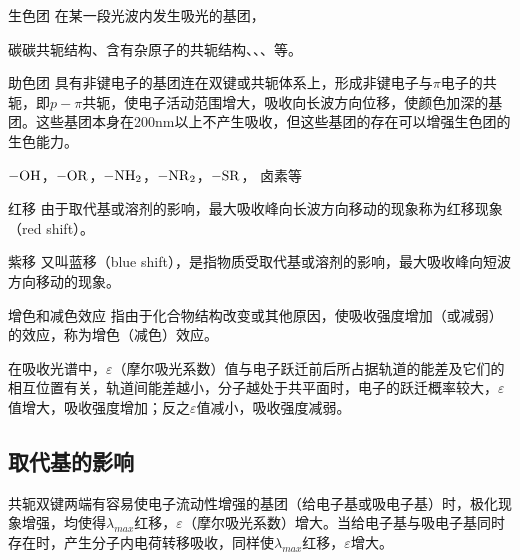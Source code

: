 \begin{definition*}{生色团}
    在某一段光波内发生吸光的基团，
    \begin{example}
        碳碳共轭结构、含有杂原子的共轭结构、、、等。
    \end{example}
\end{definition*}
\begin{definition*}{助色团}
    具有非键电子的基团连在双键或共轭体系上，形成非键电子与$\pi$电子的共轭，即$p-\pi$共轭，使电子活动范围增大，吸收向长波方向位移，使颜色加深的基团。这些基团本身在200$\mathrm{nm}$以上不产生吸收，但这些基团的存在可以增强生色团的生色能力。
    \begin{example}
        $\ce{-OH}$，$\ce{-OR}$，$ \ce{-NH_{2}}$，$ \ce{-NR_{2}}$，$ \ce{-SR}$， 卤素等
    \end{example}
\end{definition*}
\begin{definition*}{红移}
    由于取代基或溶剂的影响，最大吸收峰向长波方向移动的现象称为红移现象 （red shift）。
\end{definition*}
\begin{definition*}{紫移}
    又叫蓝移（blue shift），是指物质受取代基或溶剂的影响，最大吸收峰向短波方向移动的现象。
\end{definition*}
\begin{definition*}{增色和减色效应}
    指由于化合物结构改变或其他原因，使吸收强度增加（或减弱）的效应，称为增色（减色）效应。
\end{definition*}
\begin{note}
    在吸收光谱中，$\varepsilon $（摩尔吸光系数）值与电子跃迁前后所占据轨道的能差及它们的相互位置有关，轨道间能差越小，分子越处于共平面时，电子的跃迁概率较大，$\varepsilon $值增大，吸收强度增加；反之$\varepsilon$值减小，吸收强度减弱。
\end{note}
\subsection{取代基的影响} 
共轭双键两端有容易使电子流动性增强的基团（给电子基或吸电子基）时，极化现象增强，均使得$\lambda_{max}$红移，$\varepsilon$（摩尔吸光系数）增大。当给电子基与吸电子基同时存在时，产生分子内电荷转移吸收，同样使$\lambda_{max}$红移，$\varepsilon$增大。

